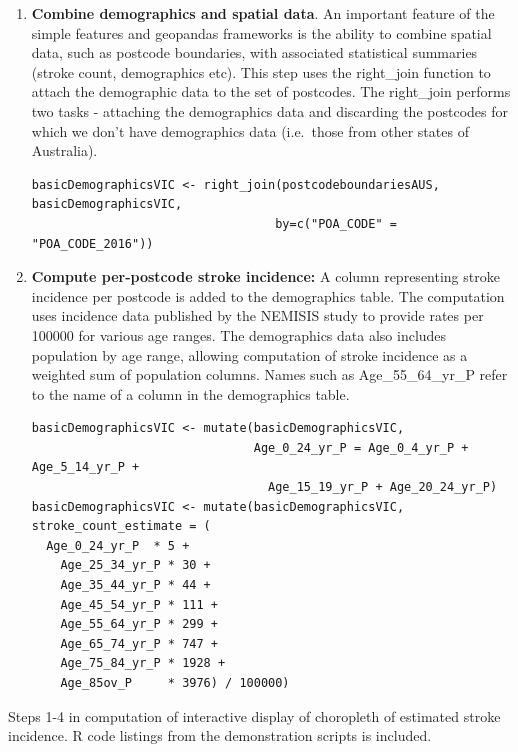 \documentclass[utf8]{frontiersHLTH}
\begin{document}
\begin{table}[h]
\begin{center}
\begin{mdframed}[backgroundcolor=blue!20]
\begin{enumerate}
\begin{lstlisting}
\end{lstlisting}
\item
  {\bf Combine demographics and spatial data}. An important feature of the
  simple features and geopandas frameworks is the ability to combine
  spatial data, such as postcode boundaries, with associated statistical
  summaries (stroke count, demographics etc). This step uses the
  right\_join function to attach the demographic data to the set of
  postcodes. The right\_join performs two tasks - attaching the
  demographics data and discarding the postcodes for which we don't have
  demographics data (i.e.~those from other states of Australia).
\begin{lstlisting}
basicDemographicsVIC <- right_join(postcodeboundariesAUS, basicDemographicsVIC, 
                                  by=c("POA_CODE" = "POA_CODE_2016"))
\end{lstlisting}
\item
  {\bf Compute per-postcode stroke incidence:} A column representing stroke
  incidence per postcode is added to the demographics table. The
  computation uses incidence data published by the NEMISIS\cite{thrift_stroke_2000}
  study to provide rates per 100000 for various age ranges. The
  demographics data also includes population by age range, allowing
  computation of stroke incidence as a weighted sum of population
  columns. Names such as Age\_55\_64\_yr\_P refer to the name of a
  column in the demographics table.
\begin{lstlisting}
basicDemographicsVIC <- mutate(basicDemographicsVIC, 
                               Age_0_24_yr_P = Age_0_4_yr_P + Age_5_14_yr_P + 
                                 Age_15_19_yr_P + Age_20_24_yr_P)
basicDemographicsVIC <- mutate(basicDemographicsVIC, stroke_count_estimate = ( 
  Age_0_24_yr_P  * 5 +  
    Age_25_34_yr_P * 30 +   
    Age_35_44_yr_P * 44 +  
    Age_45_54_yr_P * 111 +  
    Age_55_64_yr_P * 299 +  
    Age_65_74_yr_P * 747 + 
    Age_75_84_yr_P * 1928 +  
    Age_85ov_P     * 3976) / 100000)
\end{lstlisting}
\end{enumerate}
\end{mdframed}
\end{center}
\caption{Steps 1-4 in computation of interactive display of choropleth of
  estimated stroke incidence. R code listings from the demonstration scripts
is included. \label{tab:exampleA1}}
\end{table}
\end{document}
